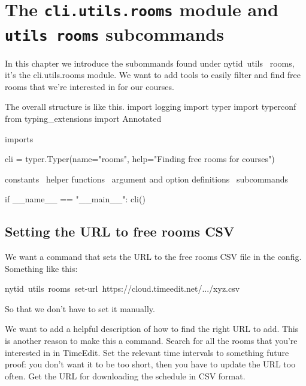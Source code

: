 \chapter{The \texttt{cli.utils.rooms} module and \texttt{utils rooms} %
subcommands}%
\label{cli.utils.rooms}

In this chapter we introduce the subommands found under {\Tt{}nytid\ utils\ \nwnewline
rooms\nwendquote},
it's the {\Tt{}cli.utils.rooms\nwendquote} module.
We want to add tools to easily filter and find free rooms that we're interested 
in for our courses.

The overall structure is like this.
\endmoddef\nwstartdeflinemarkup\nwenddeflinemarkup
import logging
import typer
import typerconf
from typing_extensions import Annotated

\LA{}imports~{\nwtagstyle{}}\RA{}

cli = typer.Typer(name="rooms",
                  help="Finding free rooms for courses")

\LA{}constants~{\nwtagstyle{}}\RA{}
\LA{}helper functions~{\nwtagstyle{}}\RA{}
\LA{}argument and option definitions~{\nwtagstyle{}}\RA{}
\LA{}subcommands~{\nwtagstyle{}}\RA{}

if __name__ == "__main__":
  cli()
\nwendcode{}\nwdocspar


\section{Setting the URL to free rooms CSV}

We want a command that sets the URL to the free rooms CSV file in the config.
Something like this:
\begin{center}
{\Tt{}nytid\ utils\ rooms\ set-url\ https://cloud.timeedit.net/.../xyz.csv\nwendquote}
\end{center}
So that we don't have to set it manually.

We want to add a helpful description of how to find the right URL to add.
This is another reason to make this a command.
\nwenddocs{}\endmoddef\nwstartdeflinemarkup{}\nwenddeflinemarkup
Search for all the rooms that you're interested in in TimeEdit.
Set the relevant time intervals to something future proof: you
don't want it to be too short, then you have to update the URL
too often. Get the URL for downloading the schedule in CSV
format.
\nwendcode{}\nwdocspar

